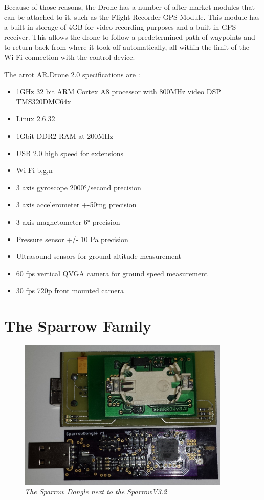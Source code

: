 Because of those reasons, the Drone has a number of after-market modules that can be attached to it, such as 
the Flight Recorder GPS Module. This module has a built-in storage of 4GB for video recording purposes and a built in GPS receiver. This allows the drone to follow a predetermined path of waypoints and to return back from where it took off automatically, all within the limit of the Wi-Fi connection with the control device.
 

The arrot AR.Drone 2.0 specifications are :
\begin{itemize}



\item   1GHz 32 bit ARM Cortex A8 processor with 800MHz video DSP TMS320DMC64x
\item   Linux 2.6.32
\item   1Gbit DDR2 RAM at 200MHz
\item   USB 2.0 high speed for extensions
\item   Wi-Fi b,g,n
\item   3 axis gyroscope 2000°/second precision
\item   3 axis accelerometer +-50mg precision
\item   3 axis magnetometer 6° precision
\item   Pressure sensor +/- 10 Pa precision
\item   Ultrasound sensors for ground altitude measurement
\item   60 fps vertical QVGA camera for ground speed measurement
\item	30 fps 720p front mounted camera 	

\end{itemize}


\section{The Sparrow Family}

\begin{figure}[ht]
\begin{center}
\includegraphics[width=0.9\textwidth]{hw_platform/sparrow.jpg}
\end{center}
\caption{\small \itshape{The Sparrow Dongle next to the SparrowV3.2}}
\end{figure}
 
